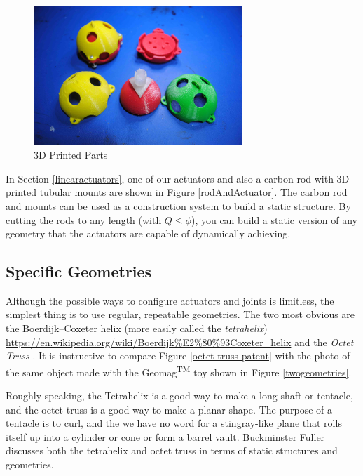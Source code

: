 \documentclass[11pt]{article}
\begin{document}
\begin{figure}[!ht]
  \centering
    \includegraphics[width=0.7\textwidth]{figureslowres/Parts.jpg}
    \caption[3D Printed Parts]{3D Printed Parts}
      \label{parts}
\end{figure}

In Section \ref{linearactuators}, one of our actuators and also a carbon rod with 3D-printed tubular mounts
are shown in Figure \ref{rodAndActuator}.
The carbon rod and mounts can be used as a construction system to build a static structure.
By cutting the rods to any length (with $Q \leq \phi$), you can build a static version of any geometry that
the actuators
are capable of dynamically achieving.

\subsection{Specific Geometries}

Although the possible ways to configure actuators and joints is limitless, the simplest thing is to
use regular, repeatable geometries. The two most obvious are the Boerdijk--Coxeter helix
(more easily called the \textit{tetrahelix})
\url{https://en.wikipedia.org/wiki/Boerdijk%E2%80%93Coxeter_helix}
  and the \emph{Octet Truss}
  \cite{richard1961synergetic}.
  It is instructive to compare Figure \ref{octet-truss-patent} with the photo of the same object
  made with the Geomag\textsuperscript{TM} toy shown in Figure \ref{twogeometries}.
    
Roughly speaking, the Tetrahelix is a good way to make a long shaft or tentacle, and the octet truss
is a good way to make a planar shape. The purpose of a tentacle is to curl, and the we have no word for
a stingray-like plane that rolls
itself up into a cylinder or cone or form a barrel vault. Buckminster Fuller discusses
both the tetrahelix and octet truss \cite{fuller1982synergetics} in terms of static structures and geometries.
\end{document}

